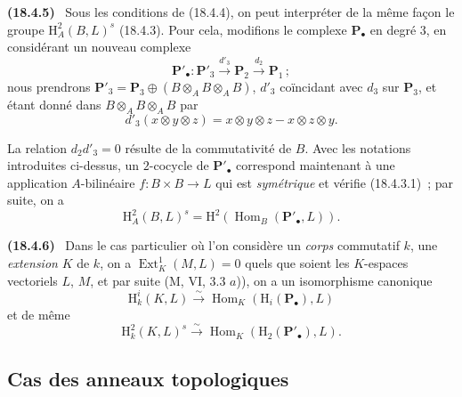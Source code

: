 \documentclass[10pt,oneside]{book}
\makeatletter
\newcommand{\setmanualcurrentlabel}[1]{\def\@currentlabel{#1}}
\newenvironment{env}[1][]{\setmanualcurrentlabel{#1}\par\medskip\noindent\textbf{(#1)}\ }{\par}
\makeatother
\begin{document}
\begin{env}[18.4.5]
\label{0.18.4.5-fr}
Sous les conditions de (18.4.4), on peut interpréter de la même façon le
groupe $\mathrm H_A^2(B,L)^s$ (18.4.3). Pour cela, modifions le complexe
$\mathbf P_\bullet$ en degré $3$, en considérant un nouveau complexe
\[
  \mathbf P'_\bullet:\mathbf P'_3\xrightarrow{d'_3}\mathbf P_2
  \xrightarrow{d_2}\mathbf P_1\,;
\]
nous prendrons
$\mathbf P'_3=\mathbf P_3\oplus(B\otimes_A B\otimes_A B)$, $d'_3$ coïncidant
avec $d_3$ sur $\mathbf P_3$, et étant donné dans $B\otimes_A B\otimes_A B$
par
\[
  d'_3(x\otimes y\otimes z)=x\otimes y\otimes z-x\otimes z\otimes y.
\]

La relation $d_2d'_3=0$ résulte de la commutativité de $B$. Avec les notations
introduites ci-dessus, un $2$-cocycle de $\mathbf P'_\bullet$ correspond
maintenant à une application $A$-bilinéaire $f:B\times B\to L$ qui est
\emph{symétrique} et vérifie (18.4.3.1)~; par suite, on a
\[
  \mathrm H_A^2(B,L)^s
  =\mathrm H^2(\operatorname{Hom}_B(\mathbf P'_\bullet,L)).
\]
\end{env}

\begin{env}[18.4.6]
\label{0.18.4.6-fr}
Dans le cas particulier où l'on considère un \emph{corps} commutatif $k$, une
\emph{extension} $K$ de $k$, on a $\operatorname{Ext}_K^1(M,L)=0$ quels que
soient les $K$-espaces vectoriels $L$, $M$, et par suite (M, VI, 3.3 $a$)), on
a un isomorphisme canonique
\begin{equation}
\label{0.18.4.6.1-fr}
\tag{18.4.6.1}
  \mathrm H_k^i(K,L)\xrightarrow{\sim}
  \operatorname{Hom}_K(\mathrm H_i(\mathbf P_\bullet),L)
\end{equation}
et de même
\begin{equation}
\label{0.18.4.6.2-fr}
\tag{18.4.6.2}
  \mathrm H_k^2(K,L)^s\xrightarrow{\sim}
  \operatorname{Hom}_K(\mathrm H_2(\mathbf P'_\bullet),L).
\end{equation}
\end{env}

\subsection{Cas des anneaux topologiques}
\label{subsection:0.18.5-fr}
\end{document}
